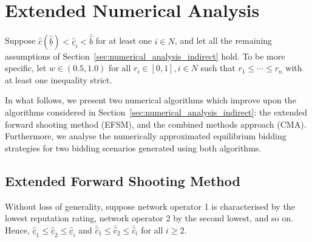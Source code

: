 \section{Extended Numerical Analysis} %
\label{sec:extended_numerical_analysis_indirect}
Suppose $\hat{c}(\underline{\hat{b}}) < \underline{\hat{c}}_i < \bar{\hat{b}}$ for at least one $i\in N$, and let all the remaining assumptions of Section~\ref{sec:numerical_analysis_indirect} hold. To be more specific, let $w\in (0.5,1.0)$ for all $r_i\in[0,1], i\in N$ such that $r_1\leq\cdots\leq r_n$ with at least one inequality strict.

In what follows, we present two numerical algorithms which improve upon the algorithms considered in Section~\ref{sec:numerical_analysis_indirect}: the extended forward shooting method (EFSM), and the combined methods approach (CMA). Furthermore, we analyse the numerically approximated equilibrium bidding strategies for two bidding scenarios generated using both algorithms.

\subsection{Extended Forward Shooting Method} %
\label{sub:extended_forward_shooting_method_indirect}
Without loss of generality, suppose network operator 1 is characterised by the lowest reputation rating, network operator 2 by the second lowest, and so on. Hence, $\underline{\hat{c}}_1\leq \underline{\hat{c}}_2\leq \underline{\hat{c}}_i$ and $\bar{\hat{c}}_1\leq \bar{\hat{c}}_2\leq \bar{\hat{c}}_i$ for all $i\geq 2$.

